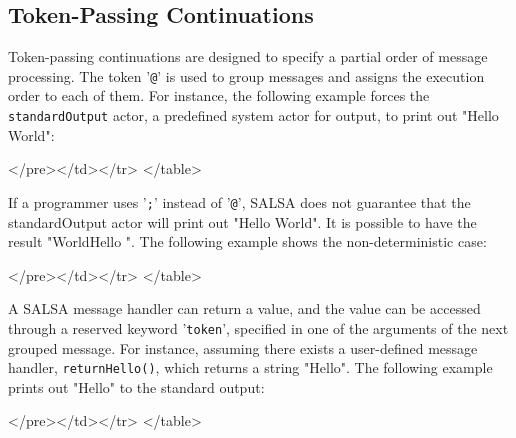 \subsection{Token-Passing Continuations}
\label{Token passing continuations}
Token-passing continuations 
are designed to specify a partial order of message processing.
The token '{\tt @}' is used to group messages 
and assigns the execution order to each of them. 
For instance, the following example 
forces the {\tt standardOutput} actor, a predefined system actor for 
output, to print out "Hello World":
{\singlespace

}
\begin{htmlonly}

 \begin{rawhtml} 
   </pre></td></tr>
  </table>
\end{rawhtml} 
\end{htmlonly} 

If a programmer uses '{\tt ;}' instead of 
'{\tt @}', SALSA does not guarantee  
that the standardOutput actor will print out "Hello World". It is 
possible to have the result 
"WorldHello ". The following example shows the 
non-deterministic case:

{\singlespace

}
\begin{htmlonly}

 \begin{rawhtml} 
   </pre></td></tr>
  </table>
\end{rawhtml} 
\end{htmlonly} 

A SALSA message handler can return a value, and 
the value can be accessed through a reserved keyword '{\tt token}', 
specified in one of the arguments of the next grouped message. 
For instance, assuming there exists a user-defined 
message handler, {\tt returnHello()}, which 
returns a string "Hello". The following example 
prints out "Hello" to the standard output:
{\singlespace

}
\begin{htmlonly}

 \begin{rawhtml} 
   </pre></td></tr>
  </table>
\end{rawhtml} 
\end{htmlonly} 
 
